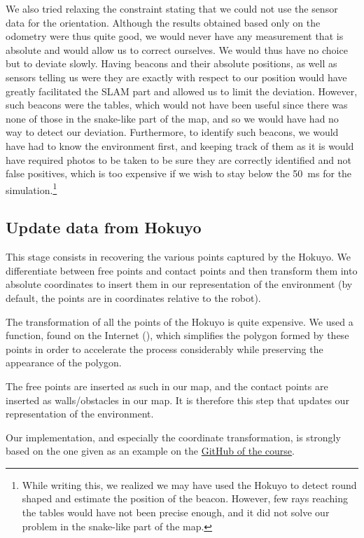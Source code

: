 \documentclass[a4paper, 10pt, conference]{ieeeconf}
\begin{document}
    We also tried relaxing the constraint stating that we could not use the sensor data for the orientation. Although the results obtained based only on the odometry were thus quite good, we would never have any measurement that is absolute and would allow us to correct ourselves. We would thus have no choice but to deviate slowly. Having beacons and their absolute positions, as well as sensors telling us were they are exactly with respect to our position would have greatly facilitated the SLAM part and allowed us to limit the deviation. However, such beacons were the tables, which would not have been useful since there was none of those in the snake-like part of the map, and so we would have had no way to detect our deviation. Furthermore, to identify such beacons, we would have had to know the environment first, and keeping track of them as it is would have required photos to be taken to be sure they are correctly identified and not false positives, which is too expensive if we wish to stay below the \SI{50}{\milli\second} for the simulation.\footnote{While writing this, we realized we may have used the Hokuyo to detect round shaped and estimate the position of the beacon. However, few rays reaching the tables would have not been precise enough, and it did not solve our problem in the snake-like part of the map.}
    
    \subsection{Update data from Hokuyo}
    
    This stage consists in recovering the various points captured by the Hokuyo. We differentiate between free points and contact points and then transform them into absolute coordinates to insert them in our representation of the environment (by default, the points are in coordinates relative to the robot).
    
    The transformation of all the points of the Hokuyo is quite expensive. We used a function, found on the Internet (\cite{youbotexplorationyt}), which simplifies the polygon formed by these points in order to accelerate the process considerably while preserving the appearance of the polygon.
    
    The free points are inserted as such in our map, and the contact points are inserted as walls/obstacles in our map. It is therefore this step that updates our representation of the environment.
    
    Our implementation, and especially the coordinate transformation, is strongly based on the one given as an example on the \href{https://github.com/ULgRobotics/trs}{GitHub of the course}.
    
\end{document}
